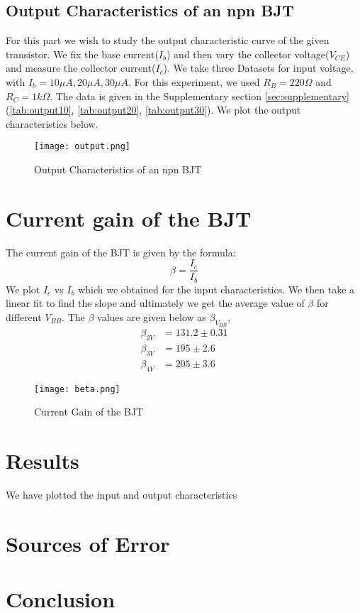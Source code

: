 \documentclass{scrartcl}
\newcommand{\1}{\mathbbm{1}}
\begin{document}
\subsection{Output Characteristics of an npn BJT}
For this part we wish to study the output characteristic curve of the given transistor. We fix the base current($I_b$) and then vary the collector voltage($V_{CE}$) and measure the collector current($I_c$). We take three 
 Datasets for input voltage, with $I_b = 10 \mu A, 20 \mu A, 30 \mu A$. For this experiment, we used $R_B = 220 \Omega$ and $R_C = 1 k\Omega$. The data is
 given in the Supplementary section \cref{sec:supplementary}(\cref{tab:output10}, \cref{tab:output20}, \cref{tab:output30}). We plot the output characteristics below.
\begin{figure}[h]
        \centering
        \texttt{[image: output.png]}
        \caption{Output Characteristics of an npn BJT}
\end{figure}
\section{Current gain of the BJT}
The current gain of the BJT is given by the formula:
\begin{equation}
        \beta = \frac{I_c}{I_b}
\end{equation}
We plot $I_c$ vs $I_b$ which we obtained for the input characteristics. We then take a linear fit to find the slope and ultimately we get the average value of $\beta$ 
for different $V_{BB}$. The $\beta$ values are given below as $\beta_{V_{BB}}$,
\begin{align}
        \beta_{2V} &= 131.2 \pm 0.31 \\
        \beta_{3V} &= 195 \pm 2.6\\
        \beta_{4V} &= 205 \pm 3.6
\end{align}
\begin{figure}[H]
        \centering
        \texttt{[image: beta.png]}
        \caption{Current Gain of the BJT}
\end{figure}
\section{Results}
We have plotted the input and output characteristics 
\section{Sources of Error}
\section{Conclusion}
\pagebreak
\end{document}

